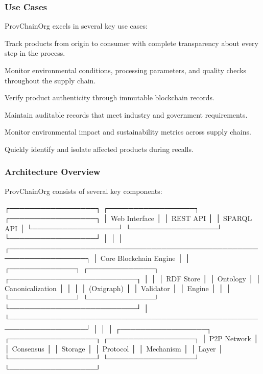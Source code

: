 \documentclass[letterpaper,10pt,english]{sphinxmanual}
\begin{document}
\subsubsection{Use Cases}
\label{\detokenize{user-guide/introduction:use-cases}}
\sphinxAtStartPar
ProvChainOrg excels in several key use cases:
\begin{description}
\sphinxAtStartPar
Track products from origin to consumer with complete transparency about every step in the process.

\sphinxAtStartPar
Monitor environmental conditions, processing parameters, and quality checks throughout the supply chain.

\sphinxAtStartPar
Verify product authenticity through immutable blockchain records.

\sphinxAtStartPar
Maintain auditable records that meet industry and government requirements.

\sphinxAtStartPar
Monitor environmental impact and sustainability metrics across supply chains.

\sphinxAtStartPar
Quickly identify and isolate affected products during recalls.

\end{description}


\subsubsection{Architecture Overview}
\label{\detokenize{user-guide/introduction:architecture-overview}}
\sphinxAtStartPar
ProvChainOrg consists of several key components:

\begin{sphinxVerbatim}[commandchars=\\\{\}]
┌─────────────────┐    ┌─────────────────┐    ┌─────────────────┐
│   Web Interface │    │   REST API      │    │   SPARQL API    │
└─────────────────┘    └─────────────────┘    └─────────────────┘
         │                       │                       │
┌─────────────────────────────────────────────────────────────────┐
│                    Core Blockchain Engine                      │
│  ┌─────────────┐  ┌─────────────┐  ┌─────────────────────────┐ │
│  │ RDF Store   │  │ Ontology    │  │ Canonicalization        │ │
│  │ (Oxigraph)  │  │ Validator   │  │ Engine                  │ │
│  └─────────────┘  └─────────────┘  └─────────────────────────┘ │
└─────────────────────────────────────────────────────────────────┘
         │                       │                       │
┌─────────────────┐    ┌─────────────────┐    ┌─────────────────┐
│   P2P Network   │    │   Consensus     │    │   Storage       │
│   Protocol      │    │   Mechanism     │    │   Layer         │
└─────────────────┘    └─────────────────┘    └─────────────────┘
\end{sphinxVerbatim}
\end{document}
